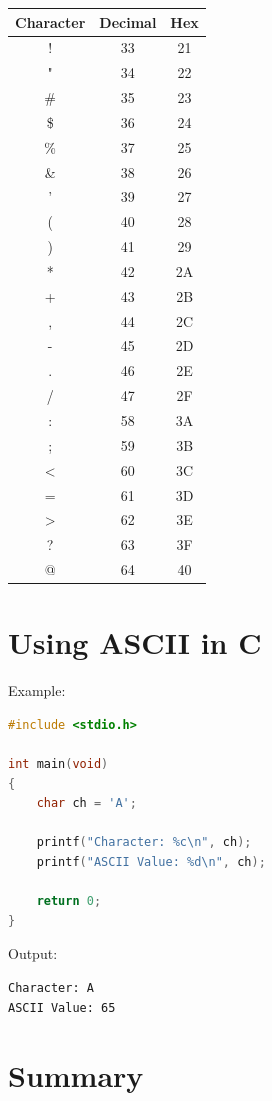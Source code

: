 \documentclass[12pt,openany]{book}
\begin{document}
\begin{center}
\begin{tabular}{|c|c|c|}
\hline
Character & Decimal & Hex \\
\hline
! & 33 & 21 \\
" & 34 & 22 \\
\# & 35 & 23 \\
\$ & 36 & 24 \\
\% & 37 & 25 \\
\& & 38 & 26 \\
' & 39 & 27 \\
( & 40 & 28 \\
) & 41 & 29 \\
* & 42 & 2A \\
+ & 43 & 2B \\
, & 44 & 2C \\
- & 45 & 2D \\
. & 46 & 2E \\
/ & 47 & 2F \\
: & 58 & 3A \\
; & 59 & 3B \\
< & 60 & 3C \\
= & 61 & 3D \\
> & 62 & 3E \\
? & 63 & 3F \\
@ & 64 & 40 \\
\hline
\end{tabular}
\end{center}

\section{Using ASCII in C}

Example:

\begin{lstlisting}[language=C]
#include <stdio.h>

int main(void)
{
    char ch = 'A';

    printf("Character: %c\n", ch);
    printf("ASCII Value: %d\n", ch);

    return 0;
}
\end{lstlisting}

Output:

\begin{lstlisting}
Character: A
ASCII Value: 65
\end{lstlisting}

\section{Summary}
\end{document}
